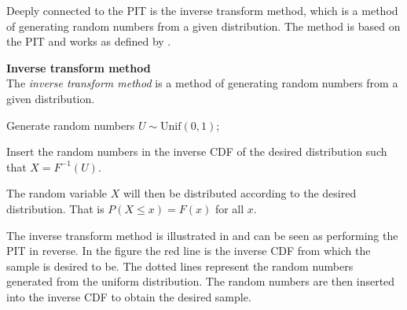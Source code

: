 Deeply connected to the \gls{PIT} is the inverse transform method, which is a method of generating random numbers from a given distribution. The method is based on the \gls{PIT} and works as defined by .
\begin{definition}\label{def:InverseTransformMethod}
    \textbf{Inverse transform method} \\
    The \emph{inverse transform method} is a method of generating random numbers from a given distribution.
    \begin{compactenum}
        \item Generate random numbers $U \sim \mathrm{Unif}(0,1)$;
        \item Insert the random numbers in the inverse \gls{CDF} of the desired distribution such that $X = F^{-1}(U)$.
    \end{compactenum}
    The random variable $X$ will then be distributed according to the desired distribution. That is $P(X\leq x) = F(x)$ for all $x$.
\end{definition}

The inverse transform method is illustrated in  and can be seen as performing the \gls{PIT} in reverse. In the figure the red line is the inverse \gls{CDF} from which the sample is desired to be. The dotted lines represent the random numbers generated from the uniform distribution. The random numbers are then inserted into the inverse \gls{CDF} to obtain the desired sample.

